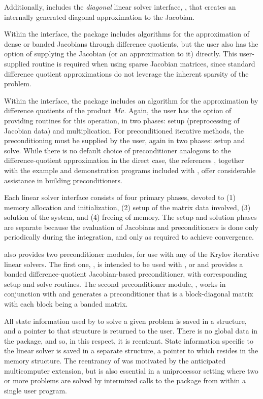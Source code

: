 Additionally, {\cvodes} includes the {\em diagonal} linear solver
interface, {\cvdiag}, that creates an internally generated diagonal
approximation to the Jacobian.

Within the {\cvdls} interface, the package includes algorithms for the
approximation of dense or banded Jacobians through difference 
quotients, but the user also has the option of supplying the Jacobian
(or an approximation to it) directly.  This user-supplied 
routine is required when using sparse Jacobian matrices, since
standard difference quotient approximations do not leverage the
inherent sparsity of the problem.

Within the {\cvspils} interface, the package includes an algorithm for
the approximation by difference quotients of the product $Mv$. Again,
the user has the option of providing routines for this operation, in
two phases: setup (preprocessing of Jacobian data) and multiplication.
For preconditioned iterative methods,  
the preconditioning must be supplied by the user, again in two phases: 
setup and solve.  While there is no
default choice of preconditioner analogous to the difference-quotient
approximation in the direct case, the references
\cite{BrHi:89,Byr:92}, together with the example and demonstration
programs included with {\cvodes}, offer considerable assistance in
building preconditioners. 

Each {\cvode} linear solver interface consists of four primary phases,
devoted to (1) memory allocation and initialization, (2) setup of the
matrix data involved, (3) solution of the system, and (4) freeing of memory.  
The setup and solution phases are separate because the evaluation of
Jacobians and preconditioners is done only periodically during the
integration, and only as required to achieve convergence. 

{\cvodes} also provides two preconditioner modules, for use with any of
the Krylov iterative linear solvers. The first one, {\cvbandpre},
is intended to be used with {\nvecs}, {\nvecopenmp} or {\nvecpthreads}
and provides a banded difference-quotient Jacobian-based
preconditioner, with corresponding setup and solve routines.
The second preconditioner module, {\cvbbdpre}, works in conjunction
with {\nvecp} and generates a preconditioner that is a block-diagonal
matrix with each block being a banded matrix.

All state information used by {\cvodes} to solve a given problem is saved
in a structure, and a pointer to that structure is returned to the
user.  There is no global data in the {\cvodes} package, and so, in this
respect, it is reentrant. State information specific to the linear
solver is saved in a separate structure, a pointer to which resides in
the {\cvodes} memory structure. The reentrancy of {\cvodes} was motivated
by the anticipated multicomputer extension, but is also essential
in a uniprocessor setting where two or more problems are solved by
intermixed calls to the package from within a single user program.
